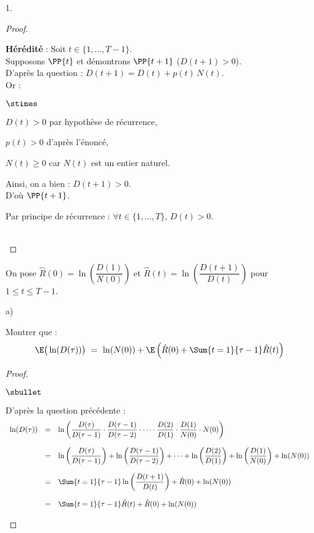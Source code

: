 \begin{noliste}{1.}
\begin{proof}
\begin{remark}
\begin{noliste}{\fitem}
        \item {\bf Hérédité} : Soit $t\in \{1, \ldots, T-1\}$.\\
        Supposons $\PP{t}$ et démontrons $\PP{t+1}$ (\ie $D(t+1)
        >0$).\\
        D'après la question  : $D(t+1) = D(t) + p(t) \, 
        N(t)$.\\
        Or :
        \begin{noliste}{$\stimes$}
	  \item $D(t) >0$ par hypothèse de récurrence,
	  \item $p(t)>0$ d'après l'énoncé,
	  \item $N(t) \geq 0$ car $N(t)$ est un entier naturel.
        \end{noliste}
        Ainsi, on a bien : $D(t+1) >0$.\\
        D'où $\PP{t+1}$.
      \end{noliste}
      Par principe de récurrence : $\forall t \in \{1, \ldots, T\}$,
      $D(t) >0$.
    \end{remark}~\\[-1.4cm]
  \end{proof}
  
  
  
  \noindent
  On pose $\hat{R}(0) = \ln \left( \dfrac{D(1)}{N(0)}\right)$ et 
  $\hat{R}(t) = \ln \left( \dfrac{D(t+1)}{D(t)}\right)$ pour $1 \leq t 
  \leq T-1$.
  
  \item 
  \begin{noliste}{a)}
    \setlength{\itemsep}{2mm}
    \item Montrer que :
    \[
      \E\big(\ln(D(\tau))\big) \ = \ \ln(N(0)) + \E\left( \hat{R}(0)
      + \Sum{t=1}{\tau -1} \hat{R}(t)\right)
    \]
    
    \begin{proof}~
      \begin{noliste}{$\sbullet$}
	\item D'après la question précédente : 
	\[
	  \begin{array}{rcl}
	    \ln(D(\tau)) &=& \ln \left( \dfrac{D(\tau)}{D(\tau -1)}
	    \cdot \dfrac{D(\tau-1)}{D(\tau -2)} \cdot \cdots \cdot
	    \dfrac{D(2)}{D(1)} \cdot \dfrac{D(1)}{N(0)} \cdot N(0)
	    \right)
	    \\[.6cm]
	    &=& \ln\left( \dfrac{D(\tau)}{D(\tau -1)}\right) + 
	    \ln\left(\dfrac{D(\tau-1)}{D(\tau-2)}\right) +
	    \cdots + \ln\left(\dfrac{D(2)}{D(1)}\right) + 
	    \ln\left(\dfrac{D(1)}{N(0)}\right) + \ln(N(0))
	    \\[.6cm]
	    &=& \Sum{t=1}{\tau-1} \ln \left(\dfrac{D(t+1)}{D(t)}\right)
	    + \hat{R}(0) + \ln(N(0))
	    \\[.6cm]
	    &=& \Sum{t=1}{\tau-1} \hat{R}(t) + \hat{R}(0) + \ln(N(0))
	  \end{array}
	\]
	

\end{noliste}
\end{proof}
\end{noliste}
\end{noliste}
